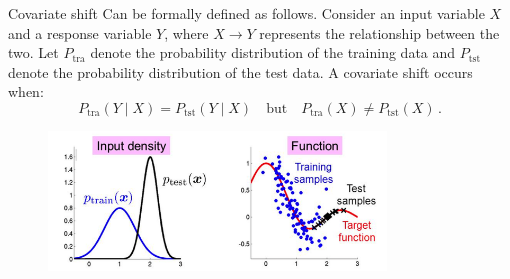 \documentclass[11pt]{beamer}
\begin{document}
\begin{frame}{Covariate shift}
Can be formally defined as follows. Consider an input variable \( X \) and a response variable \( Y \), where \( X \to Y \) represents the relationship between the two. Let \( P_{\text{tra}} \) denote the probability distribution of the training data and \( P_{\text{tst}} \) denote the probability distribution of the test data. A covariate shift occurs when:  
\[
P_{\text{tra}}(Y \mid X) = P_{\text{tst}}(Y \mid X) \quad \text{but} \quad P_{\text{tra}}(X) \neq P_{\text{tst}}(X)\,.
\]
\begin{figure}[H]
	\centering
	\includegraphics[width=0.8\textwidth]{../assets/immagine.png} 
    \label{fig:covariate-shift}
\end{figure}
\end{frame}
\end{document}
